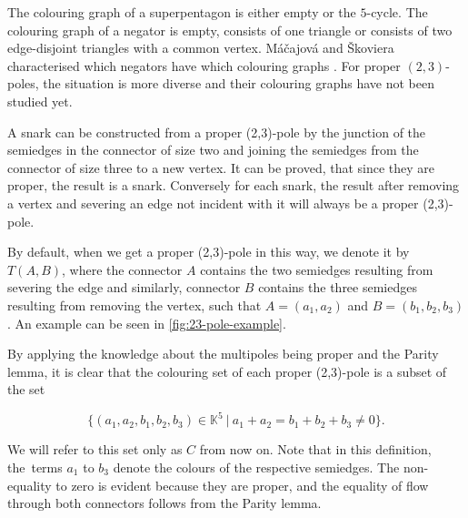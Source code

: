 The colouring graph of a superpentagon is either empty or the $5$-cycle. The colouring graph of a negator is empty, consists of one triangle or consists of two edge-disjoint triangles with a common vertex.
Máčajová and Škoviera characterised which negators have which colouring graphs \cite{IrreducibleSnarksSkoviera}.
For proper $(2,3)$-poles, the situation is more diverse and their colouring graphs have not been studied yet.






A snark can be constructed from a proper (2,3)-pole by the junction of the semiedges in the connector of size two and joining the semiedges from the connector of size three to a new vertex. It can be proved, that since they are proper, the result is a snark. Conversely for each snark, the result after removing a vertex and severing an edge not incident with it will always be a proper (2,3)-pole.

By default, when we get a proper (2,3)-pole in this way, we denote it by $T(A,B)$, where the connector $A$ contains the two semiedges resulting from severing the edge and similarly, connector $B$ contains the three semiedges resulting from removing the vertex, such that $A=(a_1,a_2)$ and $B=(b_1,b_2,b_3)$. An example can be seen in \cref{fig:23-pole-example}.

\begin{figure*}
	\centering
	
	\caption{Creation of a proper $(2,3)$-pole from a snark $G$}
	\label{fig:23-pole-example}
\end{figure*}

By applying the knowledge about the multipoles being proper and the Parity lemma, it is clear that the colouring set of each proper (2,3)-pole is a subset of the set

$$\{(a_1,a_2,b_1,b_2,b_3)\in\mathbb{K}^5~|~a_1+a_2=b_1+b_2+b_3\neq 0\}.$$

We will refer to this set only as $C$ from now on. Note that in this definition, the~terms $a_1$ to $b_3$ denote the colours of the respective semiedges. The non-equality to zero is evident because they are proper, and the equality of flow through both connectors follows from the Parity lemma.

